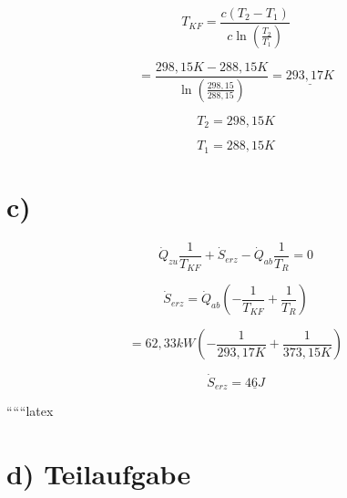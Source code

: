 \[
T_{KF} = \frac{c (T_2 - T_1)}{c \ln \left( \frac{T_2}{T_1} \right)}
\]

\[
= \frac{298,15 K - 288,15 K}{\ln \left( \frac{298,15}{288,15} \right)} = \underline{293,17 K}
\]

\[
T_2 = 298,15 K
\]

\[
T_1 = 288,15 K
\]

\section*{c)}

\[
\dot{Q}_{zu} \frac{1}{T_{KF}} + \dot{S}_{erz} - \dot{Q}_{ab} \frac{1}{T_R} = 0
\]

\[
\dot{S}_{erz} = \dot{Q}_{ab} \left( -\frac{1}{T_{KF}} + \frac{1}{T_R} \right)
\]

\[
= 62,33 kW \left( -\frac{1}{293,17 K} + \frac{1}{373,15 K} \right)
\]

\[
\dot{S}_{erz} = \underline{46 J}
\]

``````latex


\section*{d) Teilaufgabe}

